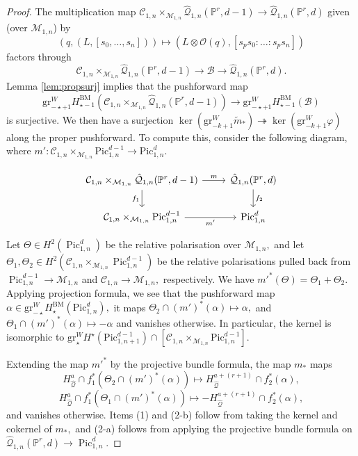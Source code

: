 \documentclass[10pt,a4paper]{amsart}
\newcommand{\PP}{\mathbb{P}}
\DeclareMathOperator{\Pic}{Pic}
\newcommand{\gr}{\mathrm{gr}}
\begin{document}
\begin{proof}
The multiplication map $\mathcal{C}_{1,n}\times_{\mathcal{M}_{1,n}} \hat{\mathcal{Q}}_{1,n}(\PP^r,d-1)\to \hat{\mathcal{Q}}_{1,n}(\PP^r,d)$ given (over $\mathcal{M}_{1,n}$) by $$(q, (L, [s_0,\dots,s_n]))\mapsto (L\otimes \mathcal{O}(q), [s_p s_0:\dots:s_p s_n])$$ factors through $$\mathcal{C}_{1,n}\times_{\mathcal{M}_{1,n}} \hat{\mathcal{Q}}_{1,n}(\PP^r,d-1)\to \mathcal{B}\to \hat{\mathcal{Q}}_{1,n}(\PP^r,d).$$ Lemma \ref{lem:propsurj} implies that the pushforward map $$\gr^W_{-\star+1} H_{{\star-1}}^{\mathrm{BM}}(\mathcal{C}_{1,n}\times_{\mathcal{M}_{1,n}}\hat{\mathcal{Q}}_{1,n}(\PP^r,d-1))\to \gr^W_{-\star+1} H_{{\star-1}}^{\mathrm{BM}}(\mathcal{B})$$ is surjective. We then have a surjection $\ker(\gr^W_{-k+1}\tilde m_*)\twoheadrightarrow\ker(\gr^W_{-k+1}\varphi)$ along the proper pushforward. To compute this, consider the following diagram, where $m': \mathcal{C}_{1,n}\times_{\mathcal{M}_{1,n}}\mathrm{Pic}^{d-1}_{1,n}\to \mathrm{Pic}^{d}_{1,n}.$

\[\begin{tikzcd}
	{\mathcal{C}_{1,n}\times_{\mathcal{M}_{1,n}} \hat{\mathcal{Q}}_{1,n}(\PP^r,d-1)} & {\hat{\mathcal{Q}}_{1,n}(\PP^r,d)} \\
	{\mathcal{C}_{1,n}\times_{\mathcal{M}_{1,n}}\mathrm{Pic}^{d-1}_{1,n}} & {\mathrm{Pic}^{d}_{1,n}}
	\arrow["m", from=1-1, to=1-2]
	\arrow["{f_1}"', from=1-1, to=2-1]
	\arrow["{f_2}", from=1-2, to=2-2]
	\arrow["{m'}"', from=2-1, to=2-2]
\end{tikzcd}\]

Let $\Theta\in H^2(\Pic^d_{1,n})$ be the relative polarisation over $\mathcal{M}_{1,n},$ and let $\Theta_1,\Theta_2\in H^2(\mathcal{C}_{1,n}\times_{\mathcal{M}_{1,n}}\Pic^{d-1}_{1,n})$ be the relative polarisations pulled back from $\Pic^{d-1}_{1,n}\to \mathcal{M}_{1,n}$ and $\mathcal{C}_{1,n}\to \mathcal{M}_{1,n},$ respectively. We have ${m'}^*(\Theta) = \Theta_1 + \Theta_2.$ Applying projection formula, we see that the pushforward map $\alpha\in \mathrm{gr}^W_{-\star} H_{\star}^{\mathrm{BM}}(\mathrm{Pic}^{d}_{1,n}),$ it maps $\Theta_2\cap (m')^*(\alpha)\mapsto \alpha,$ and $\Theta_1\cap (m')^*(\alpha)\mapsto -\alpha$ and vanishes otherwise. In particular, the kernel is isomorphic to $\mathrm{gr}^W_{\star} H^\star(\mathrm{Pic}^{d-1}_{1,n+1})\cap [\mathcal{C}_{1,n}\times_{\mathcal{M}_{1,n}}\mathrm{Pic}_{1,n}^{d-1}].$

Extending the map ${m'}^*$ by the projective bundle formula, the map $m_*$ maps $$H_{\hat{\mathcal{Q}}}^a\cap f_1^*(\Theta_2\cap (m')^*(\alpha))\mapsto H_{\hat{\mathcal{Q}}}^{a+(r+1)}\cap f_2^*(\alpha),$$ $$H_{\hat{\mathcal{Q}}}^a\cap f_1^*(\Theta_1\cap (m')^*(\alpha))\mapsto -H_{\hat{\mathcal{Q}}}^{a+(r+1)}\cap f_2^*(\alpha),$$
and vanishes otherwise. Items (1) and (2-b) follow from taking the kernel and cokernel of $m_*,$ and (2-a) follows from applying the projective bundle formula on $\hat{\mathcal{Q}}_{1,n}(\PP^r,d)\to \Pic^d_{1,n}.$
\end{proof}
\end{document}
